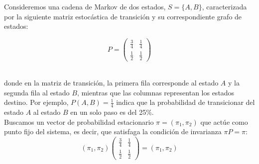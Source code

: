 \begin{ejemplo}
    Consideremos una cadena de Markov de dos estados, $S = \{A, B\}$, caracterizada por la siguiente matriz estocástica de transición y su correspondiente grafo de estados:

    \noindent
    \begin{minipage}{0.45\textwidth}
        \centering
        \[ 
        P =
        \begin{pmatrix} 
        \frac{3}{4} & \frac{1}{4} \\[0.15cm] 
        \frac{1}{2} & \frac{1}{2} 
        \end{pmatrix} 
        \]
    \end{minipage}
    \begin{minipage}{0.5\textwidth}
        \centering
    \end{minipage}\\
    \noindent
    donde en la matriz de transición, la primera fila corresponde al estado $A$ y la segunda fila al estado $B$, mientras que las columnas representan los estados destino. Por ejemplo, $P(A, B) = \frac{1}{4}$ indica que la probabilidad de transicionar del estado $A$ al estado $B$ en un solo paso es del 25\%. \\

    \noindent 
    Buscamos un vector de probabilidad estacionario $\pi = (\pi_1, \pi_2)$ que actúe como punto fijo del sistema, es decir, que satisfaga la condición de invarianza $\pi P = \pi$:\
    \begin{equation*}
        (\pi_1, \pi_2) \begin{pmatrix} \frac{3}{4} & \frac{1}{4} \\[0.15cm] \frac{1}{2} & \frac{1}{2} \end{pmatrix} = (\pi_1, \pi_2)
    \end{equation*}


\end{ejemplo}
